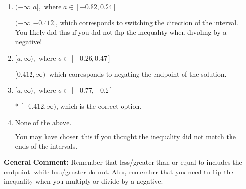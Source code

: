 \documentclass{extbook}[14pt]
\begin{document}
\begin{enumerate}
{\begin{enumerate}[label=\Alph*.]
 $(-\infty, 0.412]$, which corresponds to switching the direction of the interval AND negating the endpoint. You likely did this if you did not flip the inequality when dividing by a negative as well as not moving values over to a side properly.
\item \( (-\infty, a], \text{ where } a \in [-0.82, 0.24] \)

 $(-\infty, -0.412]$, which corresponds to switching the direction of the interval. You likely did this if you did not flip the inequality when dividing by a negative!
\item \( [a, \infty), \text{ where } a \in [-0.26, 0.47] \)

 $[0.412, \infty)$, which corresponds to negating the endpoint of the solution.
\item \( [a, \infty), \text{ where } a \in [-0.77, -0.2] \)

* $[-0.412, \infty)$, which is the correct option.
\item \( \text{None of the above}. \)

You may have chosen this if you thought the inequality did not match the ends of the intervals.
\end{enumerate}

\textbf{General Comment:} Remember that less/greater than or equal to includes the endpoint, while less/greater do not. Also, remember that you need to flip the inequality when you multiply or divide by a negative.
}
\end{enumerate}
\end{document}
